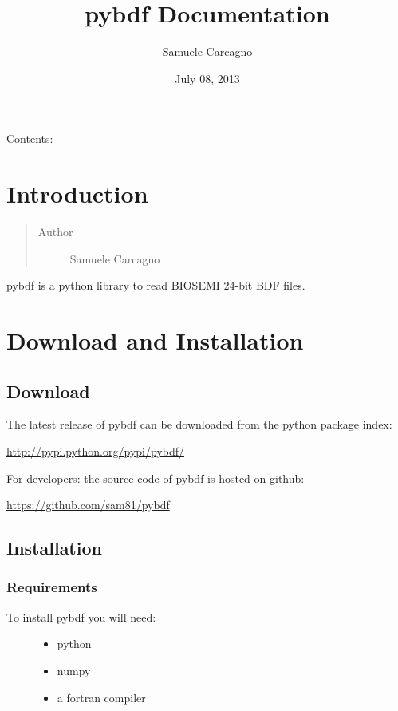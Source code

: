 \documentclass[letterpaper,10pt,english]{sphinxmanual}
\title{pybdf Documentation}
\date{July 08, 2013}
\author{Samuele Carcagno}
\begin{document}
\maketitle
\tableofcontents
{}\label{index::doc}


Contents:


\chapter{Introduction}
\label{intro:introduction}\label{intro:welcome-to-pybdf-s-documentation}\label{intro::doc}\begin{quote}\begin{description}
\item[{Author}] \leavevmode
Samuele Carcagno

\end{description}\end{quote}

pybdf is a python library to read BIOSEMI 24-bit BDF files.


\chapter{Download and Installation}
\label{intro:download-and-installation}

\section{Download}
\label{intro:download}
The latest release of pybdf can be downloaded from the python package index:

\href{http://pypi.python.org/pypi/pybdf/}{http://pypi.python.org/pypi/pybdf/}

For developers: the source code of pybdf is hosted on
github:

\href{https://github.com/sam81/pybdf}{https://github.com/sam81/pybdf}


\section{Installation}
\label{intro:installation}

\subsection{Requirements}
\label{intro:requirements}\begin{description}
\item[{To install pybdf you will need:}] \leavevmode\begin{itemize}
\item {} 
python

\item {} 
numpy

\item {} 
a fortran compiler

\end{itemize}

\end{description}
\end{document}

